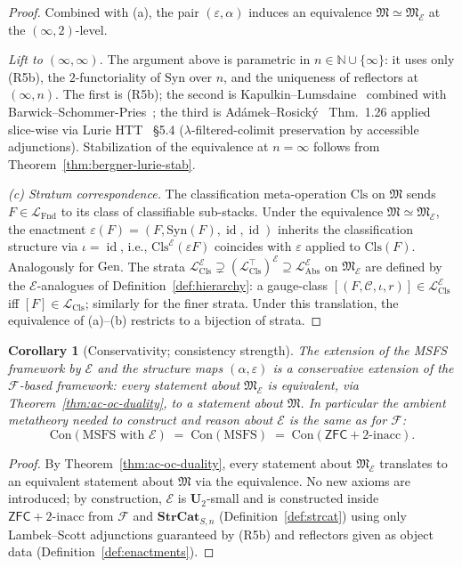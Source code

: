 \documentclass[11pt]{article}
\theoremstyle{plain}
\newtheorem{corollary}[theorem]{Corollary}
\theoremstyle{definition}
\newcommand{\cF}{\mathcal{F}}
\newcommand{\cC}{\mathcal{C}}
\newcommand{\fM}{\mathfrak{M}}
\newcommand{\LFnd}{\mathcal{L}_{\mathrm{Fnd}}}
\newcommand{\LCls}{\mathcal{L}_{\mathrm{Cls}}}
\newcommand{\LClsMax}{\mathcal{L}_{\mathrm{Cls}}^{\top}}
\newcommand{\LAbs}{\mathcal{L}_{\mathrm{Abs}}}
\newcommand{\Syn}{\mathrm{Syn}}
\newcommand{\Con}{\mathrm{Con}}
\newcommand{\ZFC}{\mathsf{ZFC}}
\newcommand{\cE}{\mathcal{E}}
\newcommand{\LAbsE}{\LAbs^{\cE}}
\newcommand{\LClsE}{\LCls^{\cE}}
\newcommand{\LClsMaxE}{(\LClsMax)^{\cE}}
\DeclareMathOperator{\id}{id}
\begin{document}
\begin{proof}
Combined with (a), the pair $(\varepsilon, \alpha)$ induces an equivalence $\fM \simeq \fM_\cE$ at the $(\infty, 2)$-level.

\emph{Lift to $(\infty, \infty)$.} The argument above is parametric in $n \in \mathbb{N} \cup \{\infty\}$: it uses only (R5b), the $2$-functoriality of $\Syn$ over $n$, and the uniqueness of reflectors at $(\infty, n)$. The first is (R5b); the second is Kapulkin--Lumsdaine~\cite{KapulkinLumsdaine2021} combined with Barwick--Schommer-Pries~\cite{BarwickSchommerPries2021}; the third is Ad\'amek--Rosick\'y~\cite{AdamekRosicky1994} Thm.~1.26 applied slice-wise via Lurie HTT~\cite{LurieHTT} \S 5.4 ($\lambda$-filtered-colimit preservation by accessible adjunctions). Stabilization of the equivalence at $n = \infty$ follows from Theorem~\ref{thm:bergner-lurie-stab}.

\emph{(c) Stratum correspondence.} The classification meta-operation $\mathrm{Cls}$ on $\fM$ sends $F \in \LFnd$ to its class of classifiable sub-stacks. Under the equivalence $\fM \simeq \fM_\cE$, the enactment $\varepsilon(F) = (F, \Syn(F), \id, \id)$ inherits the classification structure via $\iota = \id$, i.e., $\mathrm{Cls}^\cE(\varepsilon F)$ coincides with $\varepsilon$ applied to $\mathrm{Cls}(F)$. Analogously for $\mathrm{Gen}$. The strata $\LClsE \supsetneq \LClsMaxE \supseteq \LAbsE$ on $\fM_\cE$ are defined by the $\cE$-analogues of Definition~\ref{def:hierarchy}: a gauge-class $[(F, \cC, \iota, r)] \in \LClsE$ iff $[F] \in \LCls$; similarly for the finer strata. Under this translation, the equivalence of (a)--(b) restricts to a bijection of strata.
\end{proof}

\begin{corollary}[Conservativity; consistency strength]\label{cor:ac-oc-conservativity}
The extension of the MSFS framework by $\cE$ and the structure maps $(\alpha, \varepsilon)$ is a conservative extension of the $\cF$-based framework: every statement about $\fM_\cE$ is equivalent, via Theorem~\ref{thm:ac-oc-duality}, to a statement about $\fM$. In particular the ambient metatheory needed to construct and reason about $\cE$ is the same as for $\cF$:
\[
  \Con(\text{MSFS with } \cE) \;=\; \Con(\text{MSFS}) \;=\; \Con(\ZFC + 2\text{-inacc}).
\]
\end{corollary}

\begin{proof}
By Theorem~\ref{thm:ac-oc-duality}, every statement about $\fM_\cE$ translates to an equivalent statement about $\fM$ via the equivalence. No new axioms are introduced; by construction, $\cE$ is $\mathbf{U}_2$-small and is constructed inside $\ZFC + 2\text{-inacc}$ from $\cF$ and $\mathbf{StrCat}_{S, n}$ (Definition~\ref{def:strcat}) using only Lambek--Scott adjunctions guaranteed by (R5b) and reflectors given as object data (Definition~\ref{def:enactments}).
\end{proof}
\end{document}
